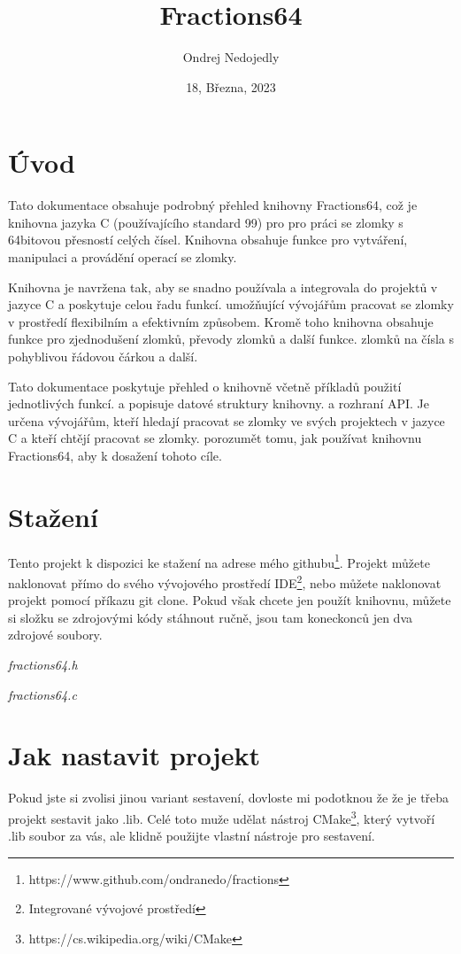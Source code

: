 \documentclass[a4paper, twocolumn, 11pt, twoside]{article}
\date{\small{18, Března, 2023}}
\title{\Huge{\textbf{Fractions64}}}
\author{Ondrej Nedojedly}
\begin{document}
\maketitle
\section{Úvod}
Tato dokumentace obsahuje podrobný přehled knihovny 
Fractions64, což je knihovna jazyka C (používajícího standard 99) pro 
pro práci se zlomky s 64bitovou přesností celých čísel. 
Knihovna obsahuje funkce pro vytváření, 
manipulaci a provádění operací se zlomky.

Knihovna je navržena tak, aby se snadno používala a integrovala
do projektů v jazyce C a poskytuje celou řadu funkcí.
umožňující vývojářům pracovat se zlomky v prostředí
flexibilním a efektivním způsobem. Kromě toho knihovna
obsahuje funkce pro zjednodušení zlomků, převody zlomků a další funkce.
zlomků na čísla s pohyblivou řádovou čárkou a další.

Tato dokumentace poskytuje přehled o knihovně
včetně příkladů použití jednotlivých funkcí.
a popisuje datové struktury knihovny.
a rozhraní API. Je určena vývojářům, kteří hledají
pracovat se zlomky ve svých projektech v jazyce C a kteří chtějí pracovat se zlomky.
porozumět tomu, jak používat knihovnu Fractions64, aby 
k dosažení tohoto cíle.

\section{Stažení}
Tento projekt k dispozici ke stažení na adrese
mého githubu\footnote{https://www.github.com/ondranedo/fractions}.
Projekt můžete naklonovat přímo do svého vývojového prostředí IDE\footnote{Integrované vývojové prostředí}, nebo můžete
naklonovat projekt pomocí příkazu git clone. Pokud však chcete jen
použít knihovnu, můžete si složku se zdrojovými kódy stáhnout ručně, 
jsou tam koneckonců jen dva zdrojové soubory.

\begin{list}{}
\item \small{\emph{fractions64.h}}
\item \small{\emph{fractions64.c}}
\end{list}
\vspace{13pt}

\section{Jak nastavit projekt}
Pokud jste si zvolisi jinou variant sestavení, dovloste mi podotknou že
že je třeba projekt sestavit jako .lib. Celé toto muže udělat nástroj CMake\footnote{https://cs.wikipedia.org/wiki/CMake}, který vytvoří .lib 
soubor za vás, ale klidně použijte vlastní nástroje pro sestavení.
\end{document}

